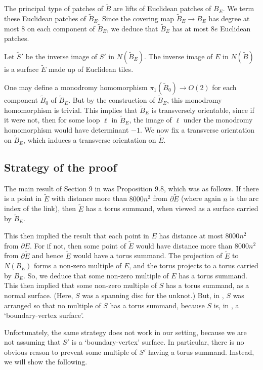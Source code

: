 \documentclass[oneside]{amsart}
\numberwithin{equation}{section}
\theoremstyle{plain}
\theoremstyle{definition}
\begin{document}
The principal type of patches of $\tilde B$ are lifts of Euclidean patches of $B_E$.
We term these Euclidean patches of $\tilde B_E$. Since the covering map $\tilde B_E \rightarrow B_E$
has degree at most $8$ on each component of $\tilde B_E$, we deduce that $\tilde B_E$ has at most $8e$ Euclidean patches.

Let $\tilde S'$ be the inverse image of $S'$ in $N(\tilde B_E)$.
The inverse image of $E$ in $N(\tilde B)$ is a surface $\tilde E$ made up of Euclidean tiles.

One may define a monodromy homomorphism $\pi_1(\tilde B_0) \rightarrow O(2)$ for
each component $\tilde B_0$ of $\tilde B_E$. But by the construction of $\tilde B_E$, this monodromy
homomorphism is trivial. This implies that $\tilde B_E$ is transversely orientable,
since if it were not, then for some loop $\ell$ in $\tilde B_E$, the image of $\ell$
under the monodromy homomorphism would have determinant $-1$. We now 
fix a transverse orientation on $\tilde B_E$, which induces a transverse orientation on 
$\tilde E$.


\subsection{Strategy of the proof}

The main result of Section 9 in \cite{Lackenby:PolyUnknot} 
was Proposition 9.8, which was as follows. If there is a point in $\tilde E$ with distance
more than $8000n^2$ from $\partial \tilde E$ (where again $n$ is the arc index of the link),
then $\tilde E$ has a torus summand, when viewed as a surface carried by $\tilde B_E$.

This then implied the result that each point in $E$ has distance at most $8000n^2$ from $\partial E$.
For if not, then some point of $\tilde E$ would have distance more than $8000n^2$ from $\partial \tilde E$
and hence $\tilde E$ would have a torus summand. The projection of $\tilde E$ to $N(B_E)$ forms a non-zero
multiple of $E$, and the torus projects to a torus carried by $B_E$. So, we deduce that some non-zero multiple of $E$
has a torus summand. This then implied that some non-zero multiple of $S$ has a torus summand,
as a normal surface. (Here, $S$ was a spanning disc for the unknot.) But, in \cite{Lackenby:PolyUnknot}, $S$ was arranged
so that no multiple of $S$ has a torus summand, because $S$ is, in \cite{Lackenby:PolyUnknot}, a `boundary-vertex surface'.

Unfortunately, the same strategy does not work in our setting, because we are not assuming that
$S'$ is a `boundary-vertex' surface. In particular, there is no obvious reason to prevent some multiple of $S'$
having a torus summand. Instead, we will show the following.
\end{document}
